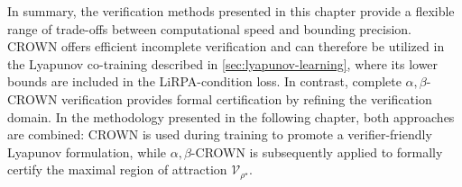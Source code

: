 In summary, the verification methods presented in this chapter provide a flexible range of trade-offs between computational speed and bounding precision. 
CROWN offers efficient incomplete verification and can therefore be utilized in the Lyapunov co-training described in \cref{sec:lyapunov-learning}, 
where its lower bounds are included in the LiRPA-condition loss. In contrast, complete $\alpha,\beta$-CROWN verification provides formal certification 
by refining the verification domain. In the methodology presented in the following chapter, both approaches are combined: 
CROWN is used during training to promote a verifier-friendly Lyapunov formulation, 
while $\alpha,\beta$-CROWN is subsequently applied to formally certify the maximal region of attraction $\mathcal{V}_{\rho^\star}$.